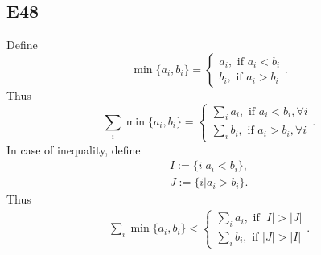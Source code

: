 \documentclass[12pt]{article}
\begin{document}
\subsection*{E48}
Define
\begin{equation*}
    \min \{a_i, b_i\} = 
    \begin{cases}
        a_i, \text{ if } a_i < b_i \\
        b_i, \text{ if } a_i > b_i
    \end{cases}
    .
\end{equation*}
Thus
\begin{equation*}
    \sum_i \min \{a_i, b_i\} = 
    \begin{cases}
        \sum_i a_i, \text{ if } a_i < b_i, \forall i \\
        \sum_i b_i, \text{ if } a_i > b_i, \forall i
    \end{cases}
    .
\end{equation*}
In case of inequality, define
\begin{equation*}
    \begin{split}
        I := \{i|a_i < b_i \}, \\
        J := \{i|a_i > b_i\}    .
    \end{split}
\end{equation*}
Thus
\begin{equation*}
    \begin{split}
        \sum_i \min\{a_i, b_i\} <
        \begin{cases}
            \sum_i a_i, \text{ if } |I| > |J| \\
            \sum_i b_i, \text{ if } |J| > |I|
        \end{cases}
        .
    \end{split}
\end{equation*}
    

\hyperlink{https://arxiv.org/pdf/2206.10452.pdf}{}
\end{document}
